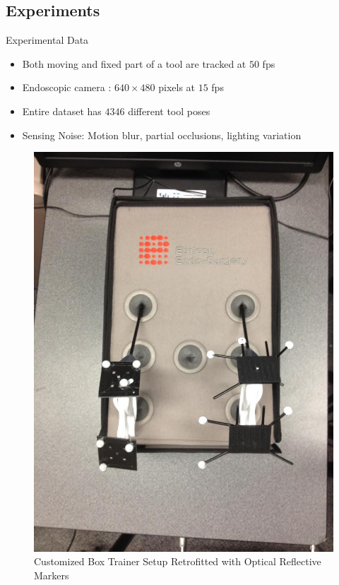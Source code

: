 \subsection[]{Experiments}
\begin{frame}{Experimental Data}
\begin{itemize}
\item Both moving and fixed part of a tool are tracked at $50$ fps
\item Endoscopic camera : $640 \times 480$ pixels at $15$ fps 
\item Entire dataset has $4346$ different tool poses
\item Sensing Noise: Motion blur, partial occlusions, lighting variation
\end{itemize}
\begin{figure}[h]
\centering
\includegraphics[height=0.4\columnwidth,trim= 40mm 50mm 30mm 35mm,clip]{figures/surgical/box}
\caption{Customized Box Trainer Setup Retrofitted with Optical Reflective Markers}
\label{fig:boxTrainer}
\end{figure}
\end{frame}

